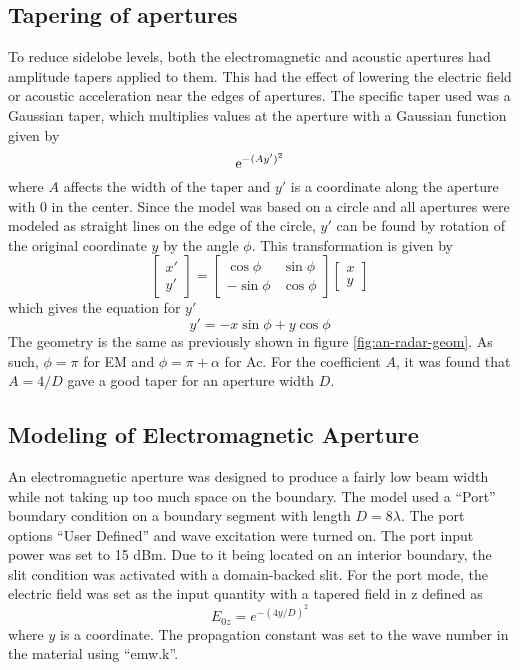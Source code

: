\documentclass[11pt,twoside]{eitExjobb}
\begin{document}
	\subsection{Tapering of apertures}
	To reduce sidelobe levels, both the electromagnetic and acoustic apertures had amplitude tapers applied to them. \addref This had the effect of lowering the electric field or acoustic acceleration near the edges of apertures. The specific taper used was a Gaussian taper, which multiplies values at the aperture with a Gaussian function given by
	\begin{equation*}
	\mathrm{e}^{-(Ay')^2}
	\end{equation*}
	where $A$ affects the width of the taper and $y'$ is a coordinate along the aperture with 0 in the center. Since the model was based on a circle and all apertures were modeled as straight lines on the edge of the circle, $y'$ can be found by rotation of the original coordinate $y$ by the angle $\phi$. This transformation is given by \addref
	\begin{equation*}
		\begin{bmatrix}
			x' \\
			y'
		\end{bmatrix}
		=
		\begin{bmatrix}
			\cos{\phi} & \sin{\phi} \\
			-\sin{\phi} & \cos{\phi}
		\end{bmatrix}
		\begin{bmatrix}
			x \\
			y
		\end{bmatrix}
	\end{equation*}
	which gives the equation for $y'$
	\begin{equation*}
		y' = -x\sin{\phi} + y\cos{\phi}
	\end{equation*}
	The geometry is the same as previously shown in figure \ref{fig:an-radar-geom}. As such, $\phi = \pi$ for EM and $\phi = \pi + \alpha$ for Ac. For the coefficient $A$, it was found that $A = 4/D$ gave a good taper for an aperture width $D$.
	
	\subsection{Modeling of Electromagnetic Aperture}
	An electromagnetic aperture was designed to produce a fairly low beam width while not taking up too much space on the boundary. The model used a ``Port'' boundary condition on a boundary segment with length $D = 8\lambda$. The port options ``User Defined'' and wave excitation were turned on. The port input power was set to 15 dBm. Due to it being located on an interior boundary, the slit condition was activated with a domain-backed slit. For the port mode, the electric field was set as the input quantity with a tapered field in z defined as
	\begin{equation*}
		E_{0z} = e^{-(4y/D)^2}
	\end{equation*}
	where $y$ is a coordinate. The propagation constant was set to the wave number in the material using ``emw.k''.
	
\end{document}
